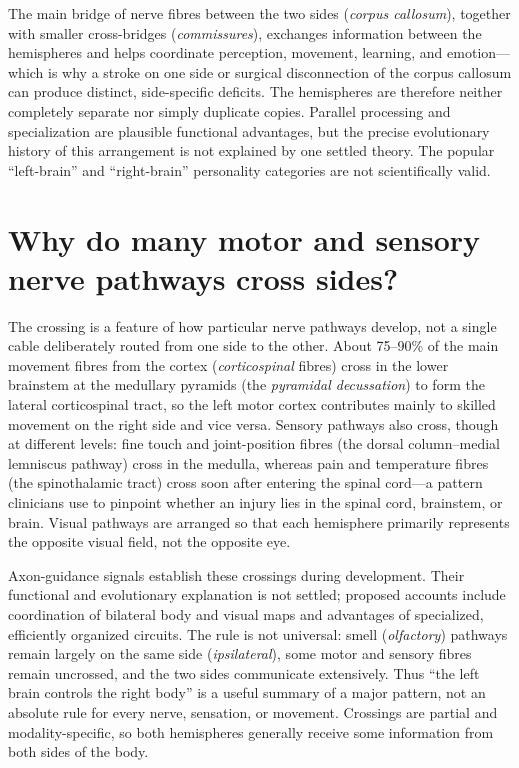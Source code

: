 \documentclass[11pt,oneside]{report}
\begin{document}
The main bridge of nerve fibres between the two sides (\emph{corpus callosum}),
together with smaller cross-bridges (\emph{commissures}), exchanges information
between the hemispheres and helps coordinate perception, movement, learning,
and emotion—which is why a stroke on one side or surgical disconnection of the
corpus callosum can produce distinct, side-specific deficits. The hemispheres are therefore neither completely separate nor
simply duplicate copies. Parallel processing and specialization are plausible
functional advantages, but the precise evolutionary history of this arrangement
is not explained by one settled theory. The popular ``left-brain'' and
``right-brain'' personality categories are not scientifically valid.

\section{Why do many motor and sensory nerve pathways cross sides?}

The crossing is a feature of how particular nerve pathways develop, not a
single cable deliberately routed from one side to the other. About 75--90\% of
the main movement fibres from the cortex (\emph{corticospinal} fibres) cross in
the lower brainstem at the medullary pyramids (the \emph{pyramidal decussation})
to form the lateral corticospinal tract, so the left motor cortex contributes
mainly to skilled movement on the right side and vice versa. Sensory pathways
also cross, though at different levels: fine touch and joint-position fibres
(the dorsal column--medial lemniscus pathway) cross in the medulla, whereas pain
and temperature fibres (the spinothalamic tract) cross soon after entering the
spinal cord—a pattern clinicians use to pinpoint whether an injury lies in the
spinal cord, brainstem, or brain. Visual pathways are arranged so that each
hemisphere primarily represents the opposite visual field, not the opposite eye.

Axon-guidance signals establish these crossings during development. Their
functional and evolutionary explanation is not settled; proposed accounts
include coordination of bilateral body and visual maps and advantages of
specialized, efficiently organized circuits. The rule is not universal:
smell (\emph{olfactory}) pathways remain largely on the same side
(\emph{ipsilateral}), some motor and sensory fibres remain uncrossed, and the
two sides communicate extensively. Thus ``the left
brain controls the right body'' is a useful summary of a major pattern, not an
absolute rule for every nerve, sensation, or movement. Crossings are partial and
modality-specific, so both hemispheres generally receive some information from
both sides of the body.
\end{document}
